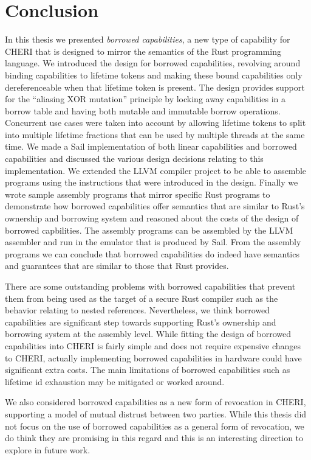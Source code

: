 \chapter{Conclusion}
\label{cha:conclusion}
In this thesis we presented \textit{borrowed capabilities}, a new type of capability for CHERI that is designed to mirror the semantics of the Rust programming language.
We introduced the design for borrowed capabilities, revolving around binding capabilities to lifetime tokens and making these bound capabilities only dereferenceable when that lifetime token is present.
The design provides support for the ``aliasing XOR mutation'' principle by locking away capabilities in a borrow table and having both mutable and immutable borrow operations.
Concurrent use cases were taken into account by allowing lifetime tokens to split into multiple lifetime fractions that can be used by multiple threads at the same time.
We made a Sail implementation of both linear capabilities and borrowed capabilities and discussed the various design decisions relating to this implementation.
We extended the LLVM compiler project to be able to assemble programs using the instructions that were introduced in the design.
Finally we wrote sample assembly programs that mirror specific Rust programs to demonstrate how borrowed capabilities offer semantics that are similar to Rust's ownership and borrowing system and reasoned about the costs of the design of borrowed capbilities.
The assembly programs can be assembled by the LLVM assembler and run in the emulator that is produced by Sail.
From the assembly programs we can conclude that borrowed capabilities do indeed have semantics and guarantees that are similar to those that Rust provides.

There are some outstanding problems with borrowed capabilities that prevent them from being used as the target of a secure Rust compiler such as the behavior relating to nested references.
Nevertheless, we think borrowed capabilities are significant step towards supporting Rust's ownership and borrowing system at the assembly level.
While fitting the design of borrowed capabilities into CHERI is fairly simple and does not require expensive changes to CHERI, actually implementing borrowed capabilities in hardware could have significant extra costs.
The main limitations of borrowed capabilities such as lifetime id exhaustion may be mitigated or worked around.

We also considered borrowed capabilities as a new form of revocation in CHERI, supporting a model of mutual distrust between two parties.
While this thesis did not focus on the use of borrowed capabilities as a general form of revocation, we do think they are promising in this regard and this is an interesting direction to explore in future work.


